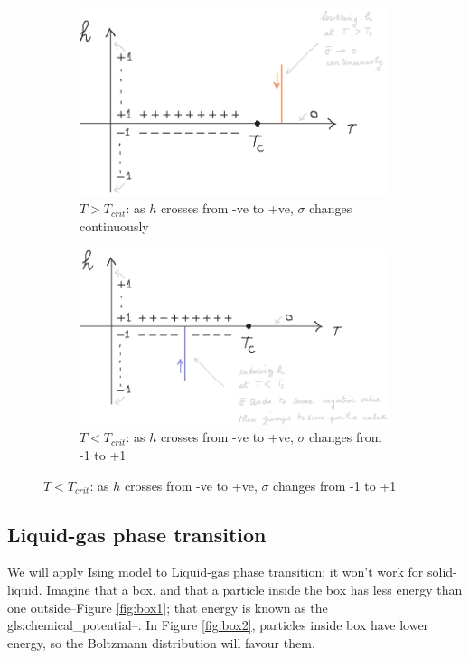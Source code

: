\documentclass[]{article}
\begin{document}
\begin{figure}[H]
	\caption{Phase transition at $T_{crit}$}\label{fig:Phase:transition:magnetic}
	\begin{subfigure}[b]{0.45\textwidth}
		\center
		\caption{$T>T_{crit}$: as $h$ crosses from -ve to +ve, $\sigma$ changes continuously}\label{fig:TgtTcrit}
		\includegraphics[width=\textwidth]{TgtTcrit}
	\end{subfigure}
	\hfill
	\begin{subfigure}[b]{0.45\textwidth}
		\center
		\caption{$T<T_{crit}$: as $h$ crosses from -ve to +ve, $\sigma$ changes from -1 to +1}\label{fig:TltTcrit}
		\includegraphics[width=\textwidth]{TltTcrit}
	\end{subfigure}
\end{figure}

\subsection{Liquid-gas phase transition}

We will apply Ising model to Liquid-gas phase transition; it won't work for solid-liquid. Imagine that a box, and that a particle inside the box has less energy than one outside--Figure \ref{fig:box1}; that energy is known as the \gls{gls:chemical_potential}--. In Figure \ref{fig:box2}, particles inside box have lower energy, so the Boltzmann distribution will favour them.
\end{document}

